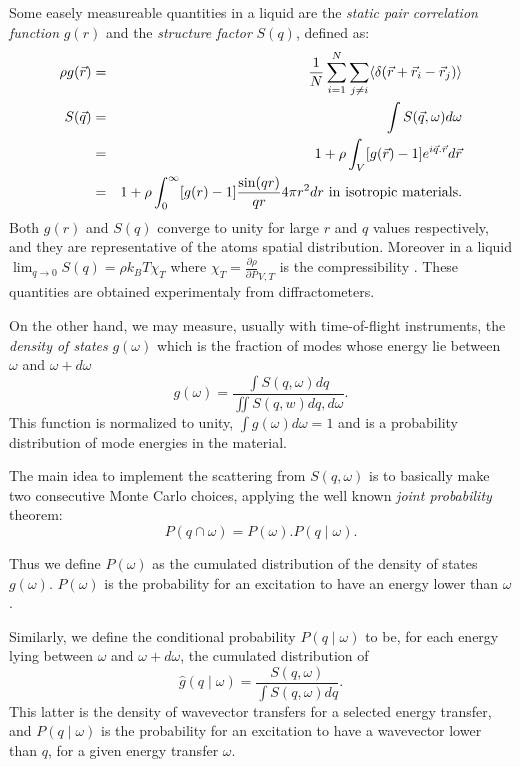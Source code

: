 Some easely measureable quantities in a liquid are the \emph{static pair correlation function} $g(r)$ and the \emph{structure factor} $S(q)$, defined as:
\begin{eqnarray}
\rho g(\vec{r}) &=& \frac{1}{N} \sum_{i=1}^N \sum_{j \neq i} \langle \delta(\vec{r}+\vec{r}_i-\vec{r}_j) \rangle \\
S(\vec{q}) &=&\int S(\vec q,\omega) d\omega \\
           &=&1 + \rho \int_V [g(\vec{r})-1] e^{i\vec{q}.\vec{r}} d\vec{r} \\
           &=&1 + \rho \int_{0}^{\infty} [g(r)-1] \frac{\sin(qr)}{qr} 4 \pi r^2 dr {\rm\ in\ isotropic\ materials.}
\end{eqnarray}
Both $g(r)$ and $S(q)$ converge to unity for large $r$ and $q$ values respectively, and they are representative of the atoms spatial distribution. Moreover in a liquid $\lim_{q \rightarrow 0} S(q) = \rho k_B T \chi_T$ where $\chi_T=\frac{\partial \rho}{\partial P}_{V,T}$ is the compressibility \cite{Egelstaff67}. These quantities are obtained experimentaly from diffractometers.

On the other hand, we may measure, usually with time-of-flight instruments, the \emph{density of states} $g(\omega)$  which is the fraction of modes whose energy lie between $\omega$ and $\omega+d\omega$ \cite{lovesey84}
\begin{equation}
g(\omega) = \frac{\int S(q,\omega) dq}{\iint S(q,w) dq, d\omega} .
\end{equation}
This function is normalized to unity, $\int g(\omega) d\omega = 1$ and is a probability distribution of mode energies in the material.

The main idea to implement the scattering from $S(q, \omega)$ is to basically make two consecutive Monte Carlo choices, applying the well known \emph{joint probability} theorem:
\begin{equation}
\label{eq:jointproba}
P(q \cap \omega) = P(\omega).P(q \mid \omega) .
\end{equation}

Thus we define $P(\omega)$ as the cumulated distribution of the density of states $g(\omega)$.  $P(\omega)$ is the probability for an excitation to have an energy lower than $\omega$.

Similarly, we define the conditional probability $P(q \mid \omega)$ to be, for each energy lying between $\omega$ and $\omega+d\omega$, the cumulated distribution of
\begin{equation}
\hat g(q\mid\omega) = \frac{S(q, \omega)}{\int S(q,\omega) dq} .
\end{equation}
This latter is the density of wavevector transfers for a selected energy transfer, and
$P(q \mid \omega)$ is the probability for an excitation to have a wavevector lower than $q$, for a given energy transfer $\omega$.


